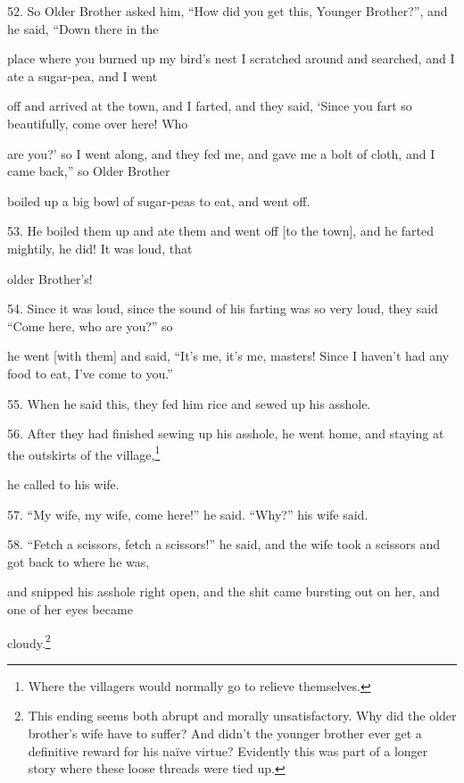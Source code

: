 52. So Older Brother asked him, ``How did you get this, Younger Brother?'',
and he said, ``Down there in the

place where you burned up my bird's nest I scratched around and searched, and I
ate a sugar-pea, and I went

off and arrived at the town, and I farted, and they said, `Since you fart so beautifully,
come over here! Who

are you?' so I went along, and they fed me, and gave me a bolt of cloth, and I
came back,'' so Older Brother

boiled up a big bowl of sugar-peas to eat, and went off.

53. He boiled them up and ate them and went off [to the town], and he farted mightily,
he did! It was loud, that

older Brother's!

54. Since it was loud, since the sound of his farting was so very loud, they said
``Come here, who are you?'' so

he went [with them] and said, ``It's me, it's me, masters! Since I haven't had
any food to eat, I've come to you.''

55. When he said this, they fed him rice and sewed up his asshole.

56. After they had finished sewing up his asshole, he went home, and staying at
the outskirts of the village,\footnote{Where the villagers would normally go to relieve themselves.}

he called to his wife.

57. ``My wife, my wife, come here!'' he said. ``Why?'' his wife said.

58. ``Fetch a scissors, fetch a scissors!'' he said, and the wife took a scissors
and got back to where he was,

and snipped his asshole right open, and the shit came bursting out on her, and
one of her eyes became

cloudy.\footnote{This ending seems both abrupt and morally unsatisfactory. Why did the older brother's wife have to suffer? And didn't the younger brother ever get a definitive reward for his naïve virtue? Evidently this was part of a longer story where these loose threads were tied up.}

